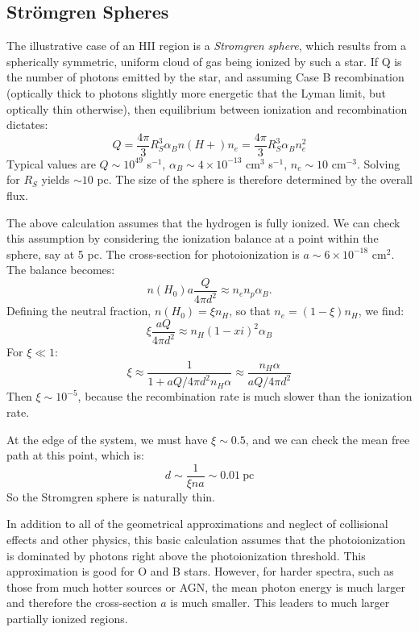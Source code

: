 \subsection{Str{\"o}mgren Spheres}

The illustrative case of an HII region is a {\it Stromgren sphere},
which results from a spherically symmetric, uniform cloud of gas being
ionized by such a star. If Q is the number of photons emitted by the
star, and assuming Case B recombination (optically thick to photons
slightly more energetic that the Lyman limit, but optically thin
otherwise), then equilibrium between ionization and recombination
dictates:
\begin{equation}
Q = \frac{4\pi}{3} R_{S}^3 \alpha_B n(H+) n_e = 
\frac{4\pi}{3} R_{S}^3 \alpha_B n_e^2 
\end{equation}
Typical values are $Q\sim 10^{49}$ s$^{-1}$, $\alpha_B \sim
4\times10^{-13}$ cm$^3$ s$^{-1}$, $n_e \sim 10$ cm$^{-3}$. Solving for
$R_S$ yields $\sim 10$ pc. The size of the sphere is therefore
determined by the overall flux.

The above calculation assumes that the hydrogen is fully ionized. We
can check this assumption by considering the ionization balance at a
point within the sphere, say at 5 pc. The cross-section for
photoionization is $a \sim 6 \times 10^{-18}$ cm$^{2}$. The balance
becomes:
\begin{equation}
n(H_0)  a \frac{Q}{4\pi d^2} \approx n_e n_p \alpha_B.
\end{equation}
Defining the neutral fraction, $n(H_0) = \xi n_H$, so
that $n_e = (1-\xi) n_H$, we find:
\begin{equation}
\xi \frac{a Q}{4 \pi d^2} \approx n_H (1-xi)^2 \alpha_B
\end{equation}
For $\xi\ll 1$:
\begin{equation}
\xi \approx \frac{1}{1 + aQ/4\pi d^2
n_H \alpha} \approx \frac{n_H \alpha}{a Q / 4\pi d^2}
\end{equation}
Then $\xi \sim 10^{-5}$, because the recombination rate is much slower
than the ionization rate. 

At the edge of the system, we must have $\xi\sim 0.5$, and we can
check the mean free path at this point, which is:
\begin{equation}
d \sim \frac{1}{\xi n a} \sim 0.01 \mathrm{~pc}
\end{equation}
So the Stromgren sphere is naturally thin.

In addition to all of the geometrical approximations and neglect of
collisional effects and other physics, this basic calculation assumes
that the photoionization is dominated by photons right above the
photoionization threshold. This approximation is good for O and B
stars. However, for harder spectra, such as those from much hotter
sources or AGN, the mean photon energy is much larger and therefore
the cross-section $a$ is much smaller. This leaders to much larger
partially ionized regions.

